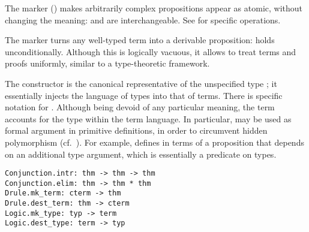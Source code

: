 \begin{isabellebody}
\begin{isamarkuptext}
  The  marker (\isa{{\isacharhash}}) makes arbitrarily complex
  propositions appear as atomic, without changing the meaning:  and  are interchangeable.  See
   for specific operations.

  The  marker turns any well-typed term into a derivable
  proposition:  holds unconditionally.  Although
  this is logically vacuous, it allows to treat terms and proofs
  uniformly, similar to a type-theoretic framework.

  The  constructor is the canonical representative of
  the unspecified type ; it essentially injects the
  language of types into that of terms.  There is specific notation
   for .
  Although being devoid of any particular meaning, the term  accounts for the type \isa{{\isasymtau}} within the term
  language.  In particular,  may be used as formal
  argument in primitive definitions, in order to circumvent hidden
  polymorphism (cf.\ ).  For example,  defines  in terms of
  a proposition  that depends on an additional type
  argument, which is essentially a predicate on types.%
\end{isamarkuptext}%
\isamarkuptrue%
%
\isadelimmlref
%
\endisadelimmlref
%
\isatagmlref
%
\begin{isamarkuptext}%
\begin{mldecls}
  \verb|Conjunction.intr: thm -> thm -> thm| \\
  \verb|Conjunction.elim: thm -> thm * thm| \\
  \verb|Drule.mk_term: cterm -> thm| \\
  \verb|Drule.dest_term: thm -> cterm| \\
  \verb|Logic.mk_type: typ -> term| \\
  \verb|Logic.dest_type: term -> typ| \\
  \end{mldecls}


\end{isamarkuptext}
\end{isabellebody}
